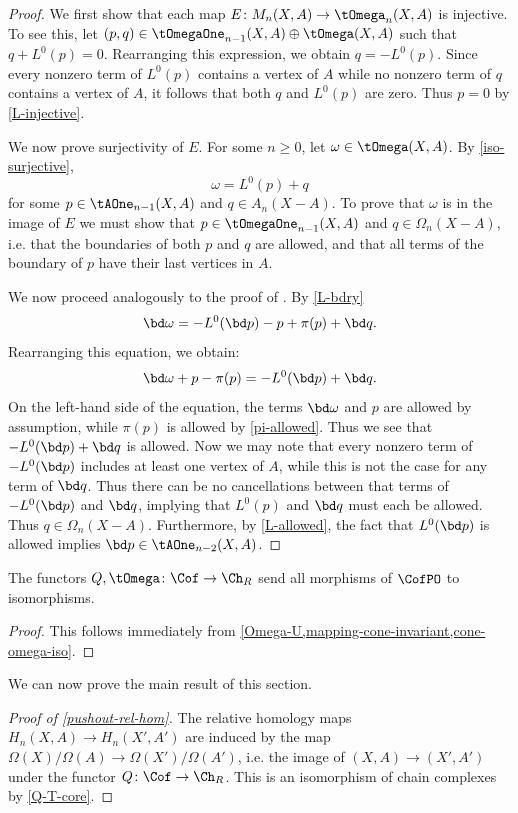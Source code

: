 \begin{proof}
We first show that each map $E \colon M_n(X,A) \to \tOmega_n(X,A)$ is injective. To see this, let $(p,q) \in \tOmegaOne_{n-1}(X,A) \oplus \tOmega(X,A)$ such that $q + L^0(p) = 0$. Rearranging this expression, we obtain $q = -L^0(p)$. 
Since every nonzero term of $L^0(p)$ contains a vertex of $A$ while no nonzero term of $q$ contains a vertex of $A$, it follows that both $q$ and $L^0(p)$ are zero. Thus $p = 0$ by \cref{L-injective}.

We now prove surjectivity of $E$. For some $n \geq 0$, let $\omega \in \tOmega(X,A)$. By \cref{iso-surjective},  \[\omega = L^0(p) + q\]for some $p \in \tAOne_{n-1}(X,A)$ and $ q \in A_n(X-A)$. To prove that $\omega$ is in the image of $E$ we must show that $p \in \tOmegaOne_{n-1}(X,A)$ and $q \in \Omega_n(X-A)$, i.e.  that the boundaries of both $p$ and $q$ are allowed, and that all terms of the boundary of $p$ have their last vertices in $A$.

We now proceed analogously to the proof of \cite[Lem.~3.10]{grigor'yan-jimenez-muranov-yau}. By \cref{L-bdry}
\[
\bd \omega = -L^0(\bd p) - p + \pi(p) + \bd q.
\]
Rearranging this equation, we obtain:
\[
\bd \omega + p - \pi(p) = -L^0(\bd p) + \bd q.
\]
On the left-hand side of the equation, the terms $\bd \omega$ and $p$ are allowed by assumption, while $\pi(p)$ is allowed by \cref{pi-allowed}. Thus we see that $-L^0(\bd p) + \bd q$ is allowed. Now we may note that every nonzero term of $-L^0(\bd p)$ includes at least one vertex of $A$, while this is not the case for any term of $\bd q$. 
Thus there can be no cancellations between that terms of $-L^0(\bd p)$ and $\bd q$, implying that $L^0(p)$ and $\bd q$ must each be allowed. Thus $q \in \Omega_n(X-A)$. Furthermore, by \cref{L-allowed}, the fact that $L^0(\bd p)$ is allowed implies $\bd p \in \tAOne_{n-2}(X,A)$.
\end{proof}

\begin{corollary}\label{Q-T-core}
The functors $Q, \tOmega \colon \Cof \to \Ch_R$ send all morphisms of $\CofPO$ to isomorphisms.
\end{corollary}

\begin{proof}
This follows immediately from \cref{Omega-U,mapping-cone-invariant,cone-omega-iso}.
\end{proof}

We can now prove the main result of this section.

\begin{proof}[Proof of \cref{pushout-rel-hom}]
The relative homology maps $H_n(X,A) \to H_n(X',A')$ are induced by the map $\Omega(X) / \Omega(A) \to \Omega(X') / \Omega(A')$, i.e.  the image of $(X,A) \to (X',A')$ under the functor $Q \colon \Cof \to \Ch_R$. This is an isomorphism of chain complexes by \cref{Q-T-core}.
\end{proof}

